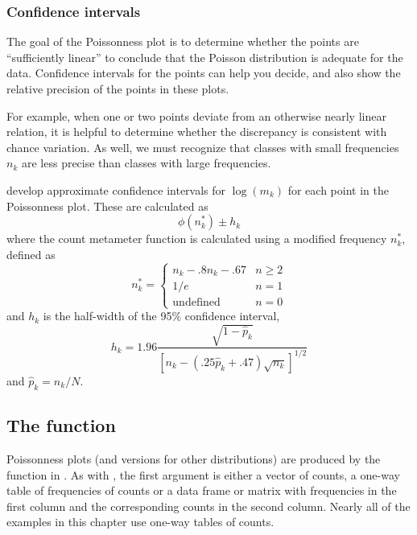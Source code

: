 \documentclass[11pt]{book}\usepackage[]{graphicx}\usepackage[]{color}
\begin{document}
\subsubsection{Confidence intervals}
The goal of the Poissonness plot is to determine whether the points
are ``sufficiently linear'' to conclude that the Poisson distribution
is adequate for the data. Confidence intervals for the points can help
you decide, and also show the relative precision of the points in these
plots.

For example, when one or two points deviate from an otherwise nearly linear
relation,
it is helpful to determine whether the discrepancy is consistent with
chance variation.
As well, we must recognize that classes with small frequencies $n_k$
are less precise than classes with large frequencies.

\citet{HoaglinTukey:85} develop approximate confidence intervals
for $\log (m_k)$ for each point in the Poissonness plot.
These are calculated as
\begin{equation}\label{eq:poisCI}
\phi \left( n_k^{*}\right) \pm h_k
\end{equation}
where the count metameter function is calculated using a modified frequency $%
n_k^{*}$, defined as
\begin{equation*}
n_k^{*}= \left\{
\begin{array}{ll}
n_k-.8n_k-.67 & n\geq 2 \\
1/e & n=1 \\
\textrm{undefined} & n=0
\end{array}
\right.
\end{equation*}
%
and $h_k$ is the half-width of the 95\% confidence interval,
\begin{equation*}
h_k=1.96\frac{\sqrt{1-\widehat{p}_k}}{[n_k-(.25\widehat{p}_k+.47)\sqrt{n_k}%
]^{1/2}}
\end{equation*}
and $\hat{p}_k = n_k / N$.


\subsection[The distplot function]{The  function}
Poissonness plots (and versions for other distributions)
are produced by the function  in .
As with , the first argument is
either a vector of counts, a one-way table of frequencies of counts or a data frame or matrix with frequencies in the first column and the corresponding counts in the second column. Nearly all of the examples in this chapter use one-way tables of counts.
\end{document}
